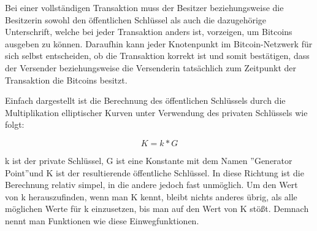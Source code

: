 Bei einer vollständigen Transaktion muss der Besitzer beziehungsweise die Besitzerin sowohl den öffentlichen Schlüssel als auch die
dazugehörige Unterschrift, welche bei jeder Transaktion anders ist, vorzeigen, um Bitcoins ausgeben zu können. Daraufhin kann 
jeder Knotenpunkt im Bitcoin-Netzwerk für sich selbst entscheiden, ob die Transaktion korrekt ist und somit bestätigen, dass 
der Versender beziehungsweise die Versenderin tatsächlich zum Zeitpunkt der Transaktion die Bitcoins besitzt.

Einfach dargestellt ist die Berechnung des öffentlichen Schlüssels durch die Multiplikation elliptischer Kurven unter Verwendung
des privaten Schlüssels wie folgt:

\[ K = k * G \]

k ist der private Schlüssel, G ist eine Konstante mit dem Namen ''Generator Point''und K ist der resultierende öffentliche 
Schlüssel. In diese Richtung ist die Berechnung relativ simpel, in die andere jedoch fast unmöglich. Um den Wert von k 
herauszufinden, wenn man K kennt, bleibt nichts anderes übrig, als alle möglichen Werte für k einzusetzen, bis man auf den Wert 
von K stößt.  Demnach nennt man Funktionen wie diese Einwegfunktionen.



